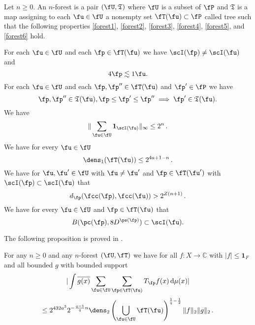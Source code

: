 Let $n\ge 0$.
An $n$-forest is a pair $(\fU, \mathfrak{T})$
where $\fU$ is a subset of $\fP$
and $\mathfrak{T}$ is a map assigning to
each $\fu\in \fU$ a nonempty set $\fT (\fu)\subset \fP$ called tree
such that the following properties
\eqref{forest1}, \eqref{forest2},
\eqref{forest3},
\eqref{forest4},
\eqref{forest5}, and
\eqref{forest6}
hold.

For each $\fu\in \fU$ and each $\fp\in \fT(\fu)$
we have $\scI(\fp) \ne \scI(\fu)$ and
\begin{equation}\label{forest1}
4\fp\lesssim 1\fu.
\end{equation}
For each $\fu \in \fU$ and each $\fp,\fp''\in \fT(\fu)$ and $\fp'\in \fP$
we have
\begin{equation}\label{forest2}
    \fp, \fp'' \in \mathfrak{T}(\fu), \fp \leq \fp' \leq \fp'' \implies \fp' \in \mathfrak{T}(\fu).
\end{equation}
We have
\begin{equation}\label{forest3}
   \|\sum_{\fu\in \fU} \mathbf{1}_{\scI(\fu)}\|_\infty \leq 2^n\,.
\end{equation}
We have for every $\fu\in \fU$
\begin{equation}\label{forest4}
\dens_1(\fT(\fu))\le 2^{4a + 1-n}\, .
\end{equation}
We have for $\fu, \fu'\in \fU$ with $\fu\neq \fu'$ and $\fp\in \fT(\fu')$ with $\scI(\fp)\subset \scI(\fu)$ that
\begin{equation}\label{forest5}
d_{\fp}(\fcc(\fp), \fcc(\fu))>2^{Z(n+1)}\, .
\end{equation}
We have for every $\fu\in \fU$ and $\fp\in \fT(\fu)$ that
\begin{equation}\label{forest6}
B(\pc(\fp), 8D^{\ps(\fp)})\subset \scI(\fu).
\end{equation}


The following proposition is proved in .
\begin{proposition}
\label{forest-operator}
\leanok
{}
For any $n\ge 0$ and any $n$-forest $(\fU,\fT)$ we have for all $f: X \to \mathbb{C}$ with $|f| \le \mathbf{1}_F$ and all bounded $g$ with bounded support
$$
    | \int \overline{g(x)} \sum_{\fu\in \fU} \sum_{\fp\in \fT(\fu)} T_{\fp} f(x) \, \mathrm{d}\mu(x)|
$$
$$
    \le
    2^{432a^3}2^{-\frac{q-1}{q} n} \dens_2\left(\bigcup_{\fu\in \fU}\fT(\fu)\right)^{\frac{1}{q}-\frac{1}{2}} \|f\|_2 \|g\|_2 \,.
$$
\end{proposition}

